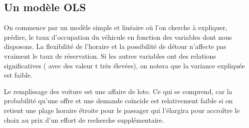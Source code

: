 \documentclass[
]{book}
\begin{document}
\hypertarget{un-moduxe8le-ols}{%
\subsection{Un modèle OLS}\label{un-moduxe8le-ols}}

On commence par un modèle simple et linéaire où l'on cherche à expliquer, prédire, le taux d'occupation du véhicule en fonction des variables dont nous disposons. La flexibilité de l'horaire et la possibilité de détour n'affecte pas vraiment le taux de réservation. Si les autres variables ont des relations significatives ( avec des valeur t très élevées), on notera que la variance expliquée est faible.

Le remplissage des voiture est une affaire de loto. Ce qui se comprend, car la probabilité qu'une offre et une demande coïncide est relativement faible si on retient une plage horaire étroite pour le passager qui l'élargira pour accroître le choix au prix d'un effort de recherche supplémentaire.
\end{document}
